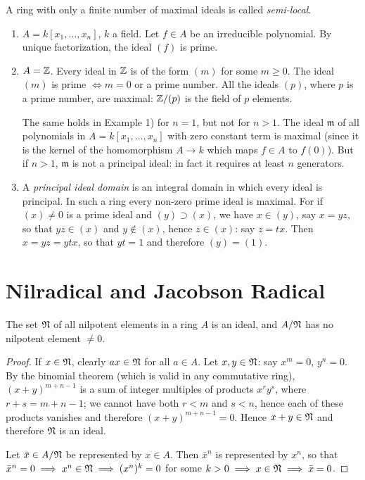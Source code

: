 A ring with only a finite number of maximal ideals is called \emph{semi-local}.

\begin{examples}
    \begin{enumerate}[1)]
        \item $A = k[x_1, \ldots, x_n]$, $k$ a field. Let $f \in A$ be an irreducible polynomial. By unique factorization, the ideal $(f)$ is prime.
        \item $A = \mathbb{Z}$. Every ideal in $\mathbb{Z}$ is of the form $(m)$ for some $m \geq 0$. The ideal $(m)$ is prime $\iff m = 0$ or a prime number. All the ideals $(p)$, where $p$ is a prime number, are maximal: $\mathbb{Z}/(p)$ is the field of $p$ elements.
        
        The same holds in Example 1) for $n = 1$, but not for $n > 1$. The ideal $\mathfrak{m}$ of all polynomials in $A = k[x_1, \ldots, x_n]$ with zero constant term is maximal (since it is the kernel of the homomorphism $A \to k$ which maps $f \in A$ to $f(0)$). But if $n > 1$, $\mathfrak{m}$ is not a principal ideal: in fact it requires at least $n$ generators.
        \item \label{ex:principal-ideal-domain}A \emph{principal ideal domain} is an integral domain in which every ideal is principal. In such a ring every non-zero prime ideal is maximal. For if $(x) \neq 0$ is a prime ideal and $(y) \supset (x)$, we have $x \in (y)$, say $x = yz$, so that $yz \in (x)$ and $y \notin (x)$, hence $z \in (x)$: say $z = tx$. Then $x = yz = ytx$, so that $yt = 1$ and therefore $(y) = (1)$.
    \end{enumerate}
\end{examples}


\section*{Nilradical and Jacobson Radical}

\begin{proposition}\label{prop:nilradical-ideal}
The set $\mathfrak{N}$ of all nilpotent elements in a ring $A$ is an ideal, and $A/\mathfrak{N}$ has no nilpotent element $\neq 0$.
\end{proposition}

\begin{proof}
If $x \in \mathfrak{N}$, clearly $ax \in \mathfrak{N}$ for all $a \in A$. Let $x, y \in \mathfrak{N}$: say $x^m = 0$, $y^n = 0$. By the binomial theorem (which is valid in any commutative ring), $(x + y)^{m+n-1}$ is a sum of integer multiples of products $x^r y^s$, where $r + s = m + n - 1$; we cannot have both $r < m$ and $s < n$, hence each of these products vanishes and therefore $(x + y)^{m+n-1} = 0$. Hence $x + y \in \mathfrak{N}$ and therefore $\mathfrak{N}$ is an ideal.

Let $\bar{x} \in A/\mathfrak{N}$ be represented by $x \in A$. Then $\bar{x}^n$ is represented by $x^n$, so that $\bar{x}^n = 0 \implies x^n \in \mathfrak{N} \implies (x^n)^k = 0$ for some $k > 0 \implies x \in \mathfrak{N} \implies \bar{x} = 0$.
\end{proof}

